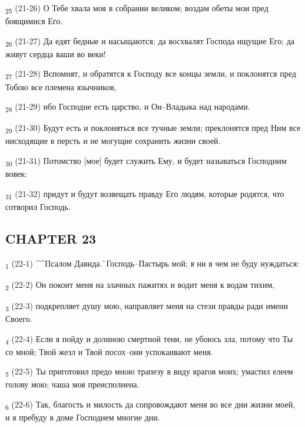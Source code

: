 \begin{tcolorbox}
\textsubscript{25} (21-26) О Тебе хвала моя в собрании великом; воздам обеты мои пред боящимися Его.
\end{tcolorbox}
\begin{tcolorbox}
\textsubscript{26} (21-27) Да едят бедные и насыщаются; да восхвалят Господа ищущие Его; да живут сердца ваши во веки!
\end{tcolorbox}
\begin{tcolorbox}
\textsubscript{27} (21-28) Вспомнят, и обратятся к Господу все концы земли, и поклонятся пред Тобою все племена язычников,
\end{tcolorbox}
\begin{tcolorbox}
\textsubscript{28} (21-29) ибо Господне есть царство, и Он--Владыка над народами.
\end{tcolorbox}
\begin{tcolorbox}
\textsubscript{29} (21-30) Будут есть и поклоняться все тучные земли; преклонятся пред Ним все нисходящие в персть и не могущие сохранить жизни своей.
\end{tcolorbox}
\begin{tcolorbox}
\textsubscript{30} (21-31) Потомство [мое] будет служить Ему, и будет называться Господним вовек:
\end{tcolorbox}
\begin{tcolorbox}
\textsubscript{31} (21-32) придут и будут возвещать правду Его людям, которые родятся, что сотворил Господь.
\end{tcolorbox}
\subsection{CHAPTER 23}
\begin{tcolorbox}
\textsubscript{1} (22-1) ^^Псалом Давида.^^ Господь--Пастырь мой; я ни в чем не буду нуждаться:
\end{tcolorbox}
\begin{tcolorbox}
\textsubscript{2} (22-2) Он покоит меня на злачных пажитях и водит меня к водам тихим,
\end{tcolorbox}
\begin{tcolorbox}
\textsubscript{3} (22-3) подкрепляет душу мою, направляет меня на стези правды ради имени Своего.
\end{tcolorbox}
\begin{tcolorbox}
\textsubscript{4} (22-4) Если я пойду и долиною смертной тени, не убоюсь зла, потому что Ты со мной; Твой жезл и Твой посох--они успокаивают меня.
\end{tcolorbox}
\begin{tcolorbox}
\textsubscript{5} (22-5) Ты приготовил предо мною трапезу в виду врагов моих; умастил елеем голову мою; чаша моя преисполнена.
\end{tcolorbox}
\begin{tcolorbox}
\textsubscript{6} (22-6) Так, благость и милость да сопровождают меня во все дни жизни моей, и я пребуду в доме Господнем многие дни.
\end{tcolorbox}
